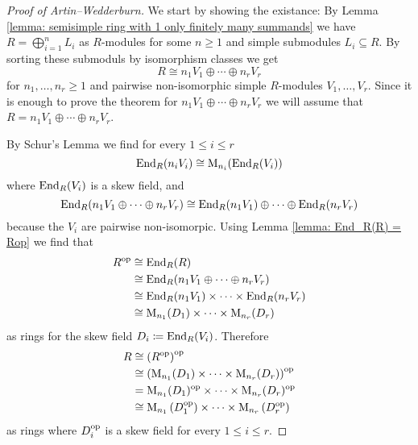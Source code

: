 \begin{proof}[Proof of Artin--Wedderburn]
  We start by showing the existance:
  By Lemma \ref{lemma: semisimple ring with 1 only finitely many summands} we have $R = \bigoplus_{i = 1}^n L_i$ as $R$-modules for some $n \geq 1$ and simple submodules $L_i \subseteq R$.
  By sorting these submoduls by isomorphism classes we get
  \[
    R \cong n_1 V_1 \oplus \dotsb \oplus n_r V_r
  \]
  for $n_1, \dotsc, n_r \geq 1$ and pairwise non-isomorphic simple $R$-modules $V_1, \dotsc, V_r$.
  Since it is enough to prove the theorem for $n_1 V_1 \oplus \dotsb \oplus n_r V_r$ we will assume that $R = n_1 V_1 \oplus \dotsb \oplus n_r V_r$.
  
  By Schur’s Lemma we find for every $1 \leq i \leq r$
  \[
          \operatorname{End}_R(n_i V_i)
    \cong \operatorname{M}_{n_i}(\operatorname{End}_R(V_i))
  \]
  where $\operatorname{End}_R(V_i)$ is a skew field, and
  \[
          \operatorname{End}_R(n_1 V_1 \oplus \dotsb \oplus n_r V_r)
    \cong \operatorname{End}_R(n_1 V_1) \oplus \dotsb \oplus \operatorname{End}_R(n_r V_r)
  \]
  because the $V_i$ are pairwise non-isomorpic.
  Using Lemma \ref{lemma: End_R(R) = Rop} we find that
  \begin{align*}
            R^{\mathrm{op}}
    &\cong  \operatorname{End}_R(R) \\
    &\cong  \operatorname{End}_R(n_1 V_1 \oplus \dotsb \oplus n_r V_r) \\
    &\cong  \operatorname{End}_R(n_1 V_1) \times \dotsb \times \operatorname{End}_R(n_r V_r) \\
    &\cong  \operatorname{M}_{n_1}(D_1) \times \dotsb \times \operatorname{M}_{n_r}(D_r)
  \end{align*}
  as rings for the skew field $D_i \coloneqq \operatorname{End}_R(V_i)$.
  Therefore
  \begin{align*}
            R
    &\cong  \left( R^{\mathrm{op}} \right)^{\mathrm{op}} \\
    &\cong  \left( \operatorname{M}_{n_1}(D_1) \times \dotsb \times \operatorname{M}_{n_r}(D_r) \right)^{\mathrm{op}} \\
    &=      \operatorname{M}_{n_1}(D_1)^{\mathrm{op}} \times \dotsb \times \operatorname{M}_{n_r}(D_r)^{\mathrm{op}} \\
    &\cong  \operatorname{M}_{n_1}\left( D_1^{\mathrm{op}} \right) \times \dotsb \times \operatorname{M}_{n_r}\left( D_r^{\mathrm{op}} \right)
  \end{align*}
  as rings where $D_i^{\mathrm{op}}$ is a skew field for every $1 \leq i \leq r$.
  

\end{proof}
